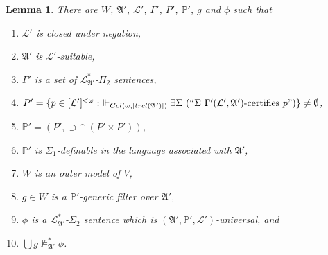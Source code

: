 \documentclass[12pt, twoside]{memoir}
\numberwithin{equation}{section}
\newtheorem{lem}[thm]{Lemma}
\theoremstyle{definition}
\theoremstyle{remark}
\theoremstyle{definition}
\theoremstyle{definition}
\theoremstyle{definition}
\theoremstyle{remark}
\begin{document}
\begin{lem}\label{lem339}
There are $W$, $\mathfrak{A}'$, $\mathcal{L}'$, $\Gamma'$, $P'$, $\mathbb{P}'$, $g$ and $\phi$ such that
\begin{enumerate}[label=(\alph*)]
    \item\label{3391} $\mathcal{L}'$ is closed under negation,
    \item\label{3392} $\mathfrak{A}'$ is $\mathcal{L}'$-suitable,
    \item\label{3393} $\Gamma'$ is a set of $\mathcal{L}^{*}_{\mathfrak{A}'}$-$\Pi_2$ sentences,
    \item\label{3394} $P' = \{p \in [\mathcal{L}']^{< \omega} : \ \Vdash_{Col(\omega, |trcl(\mathfrak{A}')|)} \exists \Sigma \ (``\Sigma \ \Gamma'(\mathcal{L}', \mathfrak{A}') \text{-certifies } p")\} \neq \emptyset$,
    \item\label{3395} $\mathbb{P}' = (P', \supset \cap \ (P' \times P'))$, 
    \item\label{3396} $\mathbb{P}'$ is $\Sigma_1$-definable in the language associated with $\mathfrak{A}'$,
    \item\label{3397} $W$ is an outer model of $V$,
    \item\label{3398} $g \in W$ is a $\mathbb{P}'$-generic filter over $\mathfrak{A}'$,
    \item\label{3399} $\phi$ is a $\mathcal{L}^{*}_{\mathfrak{A}'}$-$\Sigma_2$ sentence which is $(\mathfrak{A}', \mathbb{P}', \mathcal{L}')$-universal, and
    \item\label{33910} $\bigcup g \not \models^{*}_{\mathfrak{A}'} \phi$.
\end{enumerate}
\end{lem}
\end{document}
